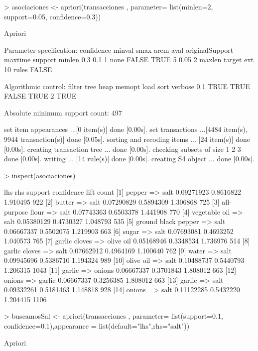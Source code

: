 \documentclass [a4paper] {article}
\begin{document}
\begin{Schunk}
\begin{Sinput}
> asociaciones <- apriori(transacciones , parameter= list(minlen=2, support=0.05, confidence=0.3))
\end{Sinput}
\begin{Soutput}
Apriori

Parameter specification:
 confidence minval smax arem  aval originalSupport maxtime support minlen
        0.3    0.1    1 none FALSE            TRUE       5    0.05      2
 maxlen target   ext
     10  rules FALSE

Algorithmic control:
 filter tree heap memopt load sort verbose
    0.1 TRUE TRUE  FALSE TRUE    2    TRUE

Absolute minimum support count: 497 

set item appearances ...[0 item(s)] done [0.00s].
set transactions ...[4484 item(s), 9944 transaction(s)] done [0.05s].
sorting and recoding items ... [24 item(s)] done [0.00s].
creating transaction tree ... done [0.00s].
checking subsets of size 1 2 3 done [0.00s].
writing ... [14 rule(s)] done [0.00s].
creating S4 object  ... done [0.00s].
\end{Soutput}
\begin{Sinput}
> inspect(asociaciones)
\end{Sinput}
\begin{Soutput}
     lhs                      rhs         support    confidence lift     count
[1]  {pepper}              => {salt}      0.09271923 0.8616822  1.910495  922 
[2]  {butter}              => {salt}      0.07290829 0.5894309  1.306868  725 
[3]  {all-purpose flour}   => {salt}      0.07743363 0.6503378  1.441908  770 
[4]  {vegetable oil}       => {salt}      0.05380129 0.4730327  1.048793  535 
[5]  {ground black pepper} => {salt}      0.06667337 0.5502075  1.219903  663 
[6]  {sugar}               => {salt}      0.07693081 0.4693252  1.040573  765 
[7]  {garlic cloves}       => {olive oil} 0.05168946 0.3348534  1.736976  514 
[8]  {garlic cloves}       => {salt}      0.07662912 0.4964169  1.100640  762 
[9]  {water}               => {salt}      0.09945696 0.5386710  1.194324  989 
[10] {olive oil}           => {salt}      0.10488737 0.5440793  1.206315 1043 
[11] {garlic}              => {onions}    0.06667337 0.3701843  1.808012  663 
[12] {onions}              => {garlic}    0.06667337 0.3256385  1.808012  663 
[13] {garlic}              => {salt}      0.09332261 0.5181463  1.148818  928 
[14] {onions}              => {salt}      0.11122285 0.5432220  1.204415 1106 
\end{Soutput}
\begin{Sinput}
> buscamosSal <- apriori(transacciones , parameter= list(support=0.1, confidence=0.1),appearance = list(default="lhs",rhs="salt"))
\end{Sinput}
\begin{Soutput}
Apriori


\end{Soutput}
\end{Schunk}
\end{document}
